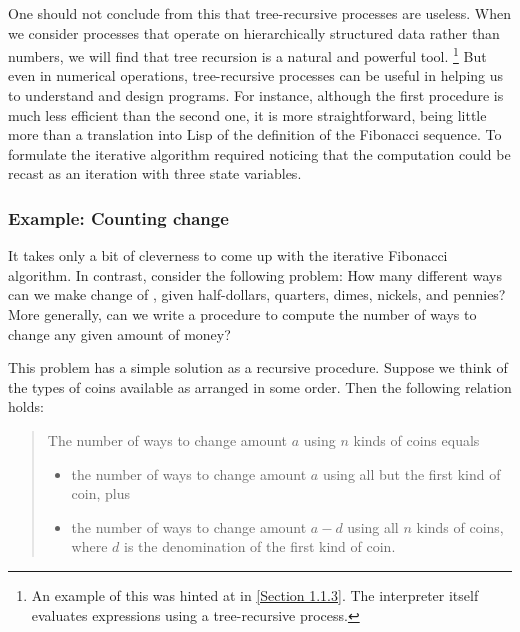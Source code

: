 One should not conclude from this that tree-recursive processes are useless.
When we consider processes that operate on hierarchically structured data rather than numbers, we will find that tree recursion is a natural and powerful tool.%
\footnote{
	An example of this was hinted at in \cref{Section 1.1.3}.
	The interpreter itself evaluates expressions using a tree-recursive process.
}
But even in numerical operations, tree-recursive processes can be useful in helping us to understand and design programs.
For instance, although the first  procedure is much less efficient than the second one, it is more straightforward, being little more than a translation into Lisp of the definition of the Fibonacci sequence.
To formulate the iterative algorithm required noticing that the computation could be recast as an iteration with three state variables.



\subsubsection*{Example: Counting change}

It takes only a bit of cleverness to come up with the iterative Fibonacci algorithm.
In contrast, consider the following problem:
How many different ways can we make change of , given half-dollars, quarters, dimes, nickels, and pennies?
More generally, can we write a procedure to compute the number of ways to change any given amount of money?

This problem has a simple solution as a recursive procedure.
Suppose we think of the types of coins available as arranged in some order.
Then the following relation holds:

\begin{quote}
	The number of ways to change amount \( a \) using \( n \) kinds of coins equals
	\begin{itemize}[leftmargin = *]

		\item
			the number of ways to change amount \( a \) using all but the first kind of coin, plus

		\item
			the number of ways to change amount \( a - d \) using all \( n \) kinds of coins, where \( d \) is the denomination of the first kind of coin.

	\end{itemize}
\end{quote}

